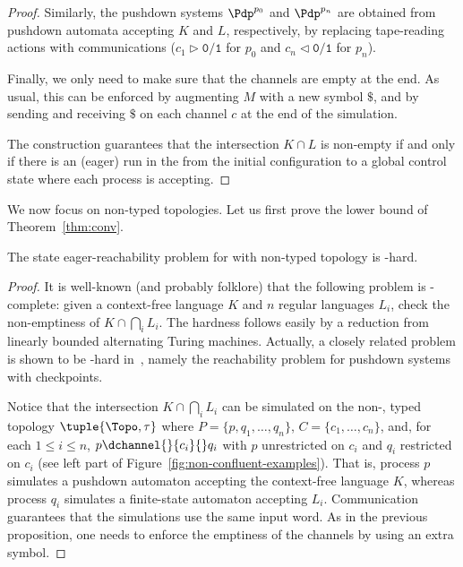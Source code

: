 \documentclass{LMCS}
\newenvironment{proposition}{\begin{prop}}{\end{prop}}
\begin{document}
\begin{proof}

  Similarly, the pushdown systems $\Pdp^{p_0}$ and $\Pdp^{p_n}$ are obtained
  from pushdown automata accepting $K$ and $L$, respectively, by replacing
  tape-reading actions with communications ($c_1 \rhd \mathtt{0}/\mathtt{1}$
  for $p_0$ and $c_n \lhd \mathtt{0}/\mathtt{1}$ for $p_n$).

 Finally, we only need to make sure that the channels are empty at the end.
  As usual, this can be enforced by augmenting $M$ with a new symbol
  $\mathtt{\$}$, and by sending and receiving $\mathtt{\$}$ on each
  channel $c$ at the end of the simulation. 

The construction guarantees that the intersection $K \cap L$ is
non-empty if and only if there is an (eager) run in the \rqcp from the
initial configuration to a global control state where each process is
accepting. 
\end{proof}



We now focus on non-\converging typed topologies.
Let us first prove the \dexptime lower bound of
Theorem~\ref{thm:conv}.

\begin{proposition} \label{prop:non-confluent-lb} The state
 eager-reachability problem for  \rqcp
  with non-\converging typed topology is  \dexptime-hard.
\end{proposition}

\begin{proof}
It is well-known (and probably folklore) that the following problem is
\dexptime-complete: 
given a context-free language $K$ and $n$ regular languages $L_i$,
check the non-emptiness of $K \cap \bigcap_i L_i$.
The hardness follows easily by a reduction from linearly bounded
alternating Turing 
machines.
Actually, a closely related problem is shown to be \dexptime-hard
in~\cite{esparza-j-2003-355-a}, namely the reachability problem for
pushdown systems with
checkpoints.

Notice that the intersection $K \cap \bigcap_i L_i$ can be simulated
on the non-\converging, 
typed topology $\tuple{\Topo,\tau}$ where
$P = \{p, q_1, \ldots, q_n\}$, $C = \{c_1, \ldots, c_n\}$, and,
for each $1 \leq i \leq n$,
$p\dchannel{}{c_i}{} q_i$ with $p$ unrestricted on $c_i$ and
$q_i$ restricted on $c_i$ (see left part of
Figure~\ref{fig:non-confluent-examples}). That is, process $p$
simulates a pushdown automaton accepting the context-free language
$K$, whereas process $q_i$ simulates a finite-state automaton
accepting $L_i$. Communication guarantees that the simulations
use the same input word. As in the previous proposition, one needs to
enforce the emptiness of the channels by using an extra symbol.
\end{proof}
\end{document}
